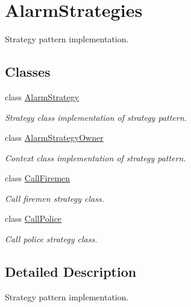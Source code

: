 \hypertarget{group__AlarmStrategies}{}\section{Alarm\+Strategies}
\label{group__AlarmStrategies}


Strategy pattern implementation.  


\subsection*{Classes}
\begin{DoxyCompactItemize}
\item 
class \hyperlink{classAlarmStrategy}{Alarm\+Strategy}
\begin{DoxyCompactList}\small\item\em Strategy class implementation of strategy pattern. \end{DoxyCompactList}\item 
class \hyperlink{classAlarmStrategyOwner}{Alarm\+Strategy\+Owner}
\begin{DoxyCompactList}\small\item\em Context class implementation of strategy pattern. \end{DoxyCompactList}\item 
class \hyperlink{classCallFiremen}{Call\+Firemen}
\begin{DoxyCompactList}\small\item\em Call firemen strategy class. \end{DoxyCompactList}\item 
class \hyperlink{classCallPolice}{Call\+Police}
\begin{DoxyCompactList}\small\item\em Call police strategy class. \end{DoxyCompactList}\end{DoxyCompactItemize}


\subsection{Detailed Description}
Strategy pattern implementation. 


